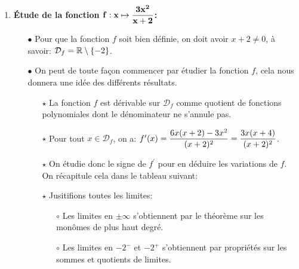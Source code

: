 \documentclass[a4paper, 11pt,reqno]{article}
\begin{document}
\begin{correction}
	\begin{enumerate}
		\item  \textbf{\'Etude de la fonction $\mathbf{f: x\mapsto \displaystyle\frac{3x^2}{x+2}}$:}
		      \begin{itemize}
			      \item[$\bullet$] Pour que la fonction $f$ soit bien d\'efinie, on doit avoir $x+2\not= 0$, \`{a} savoir: $\mathcal{D}_f=\mathbb{R}\setminus\lbrace -2\rbrace$.
			      \item[$\bullet$] On peut de toute fa\c{c}on commencer par \'etudier la fonction $f$, cela nous donnera une id\'ee des diff\'erents r\'esultats.
				      \begin{itemize}
					      \item[$\star$] La fonction $f$ est d\'erivable sur $\mathcal{D}_f$ comme quotient de fonctions polynomiales dont le d\'enominateur ne s'annule pas.
					      \item[$\star$] Pour tout $x\in\mathcal{D}_f$, on a: $f^{\prime}(x)=\displaystyle\frac{6x(x+2)-3x^2}{(x+2)^2}=\displaystyle\frac{3x(x+4)}{(x+2)^2}$.
					      \item[$\star$] On \'etudie donc le signe de $f^{\prime}$ pour en d\'eduire les variations de $f$. On r\'ecapitule cela dans le tableau suivant:
						      \flushleft {}
					      \item[$\star$] Jusitifions toutes les limites:
						      \begin{itemize}
							      \item[$\circ$] Les limites en $\pm\infty$ s'obtiennent par le th\'eor\`{e}me sur les mon\^{o}mes de plus haut degr\'e.
							      \item[$\circ$] Les limites en $-2^-$ et $-2^+$ s'obtiennent par propri\'et\'es sur les sommes et quotients de limites.

\end{itemize}
\end{itemize}
\end{itemize}
\end{enumerate}
\end{correction}
\end{document}
